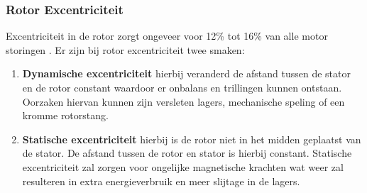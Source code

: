 \newpage

\subsubsection{Rotor Excentriciteit}

Excentriciteit in de rotor zorgt ongeveer voor 12\% tot 16\% van alle motor storingen \cite{MotorExcenttriciteit}. Er zijn bij rotor excentriciteit twee smaken:

\begin{enumerate}
	\item \textbf{Dynamische excentriciteit} hierbij veranderd de afstand tussen de stator en de rotor constant waardoor er onbalans en trillingen kunnen ontstaan. Oorzaken hiervan kunnen zijn versleten lagers, mechanische speling of een kromme rotorstang.
	
	\item \textbf{Statische excentriciteit} hierbij is de rotor niet in het midden geplaatst van de stator. De afstand tussen de rotor en stator is hierbij constant. Statische excentriciteit zal zorgen voor ongelijke magnetische krachten wat weer zal resulteren in extra energieverbruik en meer slijtage in de lagers.
\end{enumerate}

